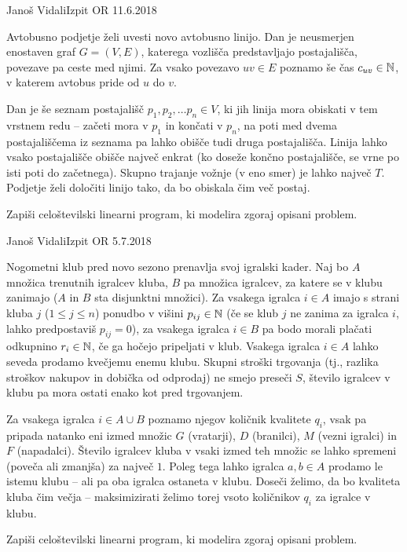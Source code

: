 \begin{naloga}{Janoš Vidali}{Izpit OR 11.6.2018}
\begin{vprasanje}[linija]
Avtobusno podjetje želi uvesti novo avtobusno linijo.
Dan je neusmerjen enostaven graf $G = (V, E)$,
katerega vozlišča predstavljajo postajališča,
povezave pa ceste med njimi.
Za vsako povezavo $uv \in E$ poznamo še čas $c_{uv} \in \mathbb{N}$,
v katerem avtobus pride od $u$ do $v$.

Dan je še seznam postajališč $p_1, p_2, \dots p_n \in V$,
ki jih linija mora obiskati v tem vrstnem redu
-- začeti mora v $p_1$ in končati v $p_n$,
na poti med dvema postajališčema iz seznama
pa lahko obišče tudi druga postajališča.
Linija lahko vsako postajališče obišče največ enkrat
(ko doseže končno postajališče, se vrne po isti poti do začetnega).
Skupno trajanje vožnje (v eno smer) je lahko največ $T$.
Podjetje želi določiti linijo tako, da bo obiskala čim več postaj.

Zapiši celoštevilski linearni program, ki modelira zgoraj opisani problem.
\end{vprasanje}
\begin{odgovor}
\end{odgovor}
\end{naloga}


\begin{naloga}{Janoš Vidali}{Izpit OR 5.7.2018}
\begin{vprasanje}[nogomet]
Nogometni klub pred novo sezono prenavlja svoj igralski kader.
Naj bo $A$ množica trenutnih igralcev kluba,
$B$ pa množica igralcev, za katere se v klubu zanimajo
($A$ in $B$ sta disjunktni množici).
Za vsakega igralca $i \in A$ imajo s strani kluba $j$ ($1 \le j \le n$)
ponudbo v višini $p_{ij} \in \mathbb{N}$
(če se klub $j$ ne zanima za igralca $i$, lahko predpostaviš $p_{ij} = 0$),
za vsakega igralca $i \in B$ pa bodo morali plačati odkupnino $r_i \in \mathbb{N}$,
če ga hočejo pripeljati v klub.
Vsakega igralca $i \in A$ lahko seveda prodamo kvečjemu enemu klubu.
Skupni stroški trgovanja
(tj., razlika stroškov nakupov in dobička od odprodaj)
ne smejo preseči $S$,
število igralcev v klubu pa mora ostati enako kot pred trgovanjem.

Za vsakega igralca $i \in A \cup B$ poznamo njegov količnik kvalitete $q_i$,
vsak pa pripada natanko eni izmed množic
$G$ (vratarji), $D$ (branilci), $M$ (vezni igralci) in $F$ (napadalci).
Število igralcev kluba v vsaki izmed teh množic se lahko spremeni
(poveča ali zmanjša) za največ $1$.
Poleg tega lahko igralca $a, b \in A$ prodamo le istemu klubu
-- ali pa oba igralca ostaneta v klubu.
Doseči želimo, da bo kvaliteta kluba čim večja
-- maksimizirati želimo torej vsoto količnikov $q_i$ za igralce v klubu.

Zapiši celoštevilski linearni program, ki modelira zgoraj opisani problem.
\end{vprasanje}
\begin{odgovor}
\end{odgovor}
\end{naloga}


